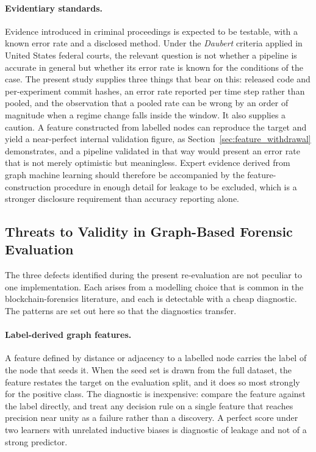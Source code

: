 \documentclass[12pt,a4paper]{article}
\begin{document}
\paragraph{Evidentiary standards.}
Evidence introduced in criminal proceedings is expected to be
testable, with a known error rate and a disclosed method. Under
the \textit{Daubert} criteria applied in United States federal
courts, the relevant question is not whether a pipeline is
accurate in general but whether its error rate is known for the
conditions of the case. The present study supplies three things
that bear on this: released code and per-experiment commit
hashes, an error rate reported per time step rather than pooled,
and the observation that a pooled rate can be wrong by an order
of magnitude when a regime change falls inside the window. It
also supplies a caution. A feature constructed from labelled
nodes can reproduce the target and yield a near-perfect internal
validation figure, as Section~\ref{sec:feature_withdrawal}
demonstrates, and a pipeline validated in that way would present
an error rate that is not merely optimistic but meaningless.
Expert evidence derived from graph machine learning should
therefore be accompanied by the feature-construction procedure in
enough detail for leakage to be excluded, which is a stronger
disclosure requirement than accuracy reporting alone.


\subsection{Threats to Validity in Graph-Based Forensic Evaluation}
\label{sec:threats}

The three defects identified during the present re-evaluation are
not peculiar to one implementation. Each arises from a modelling
choice that is common in the blockchain-forensics literature, and
each is detectable with a cheap diagnostic. The patterns are set
out here so that the diagnostics transfer.

\paragraph{Label-derived graph features.}
A feature defined by distance or adjacency to a labelled node
carries the label of the node that seeds it. When the seed set is
drawn from the full dataset, the feature restates the target on
the evaluation split, and it does so most strongly for the
positive class. The diagnostic is inexpensive: compare the
feature against the label directly, and treat any decision rule
on a single feature that reaches precision near unity as a
failure rather than a discovery. A perfect score under two
learners with unrelated inductive biases is diagnostic of leakage
and not of a strong predictor.
\end{document}
